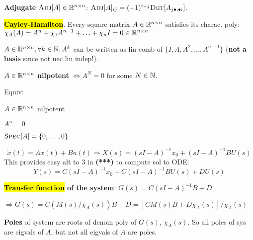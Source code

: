 \begin{Definition}
\textbf{Adjugate} $\textsc{Adj}[A]\in\mathbb R^{n\times n}$: $\textsc{Adj}[A]_{ij}=(-1)^{i+j}\textsc{Det}[A_{j\bullet,\bullet i}]$.
\end{Definition}
\begin{Theorem}
\textbf{\hl{Cayley-Hamilton}}. Every square matrix $A\in\mathbb R^{n\times n}$ satisfies its charac. poly: $\chi_A(A)=A^n+\chi_1 A^{n-1}+\ldots+\chi_n I=0\in\mathbb R^{n\times n}$
\end{Theorem}
\begin{Corollary}
$A\in\mathbb R^{n\times n}, \forall k\in\mathbb N,A^k$ can be written as lin comb of $\{I,A,A^2,\ldots,A^{n-1}\}$ (\textbf{not a basis} since not nec lin indep!).
\end{Corollary}
\begin{Definition}
$A\in\mathbb R^{n\times n}$ \textbf{nilpotent} $\Leftrightarrow A^N=0$ for some $N\in\mathbb N$.
\end{Definition}
\begin{Fact}
Equiv:
\begin{enumerate*}[label=\protect\circled{\arabic*}]
  \item $A\in\mathbb R^{n\times n}$ nilpotent
  \item $A^n=0$
  \item $\textsc{Spec}[A]=\{0,\ldots,0\}$
\end{enumerate*}
\end{Fact}
\vspace{-2mm}
\begin{equation*}
\dot x(t)=Ax(t)+Bu(t)\Rightarrow X(s)=(sI-A)^{-1}x_0+(sI-A)^{-1}BU(s)
\end{equation*}
This provides easy alt to 3 in {\color{red}\textbf{(***)}} to compute sol to ODE:
\begin{equation*}
Y(s)=C(sI-A)^{-1}x_0+C(sI-A)^{-1}BU(s)+DU(s)
\end{equation*}

\begin{Definition}
\textbf{\hl{Transfer function} of the system}: $G(s)=C(sI-A)^{-1}B+D$
\end{Definition}
\begin{Definition}
$\Rightarrow G(s)=C(M(s)/\chi_A(s))B+D=[CM(s)B+D\chi_A(s)]/\chi_A(s)$

\textbf{Poles} of system are roots of denom poly of $G(s)$, $\chi_A(s)$. So all poles of sys are eigvals of $A$, but not all eigvals of $A$ are poles.
\end{Definition}